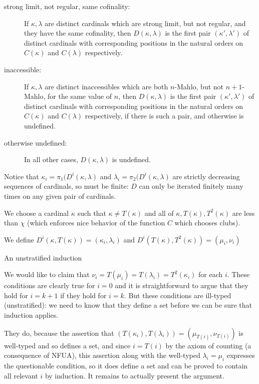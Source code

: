 \documentclass{slides}
\begin{document}
\begin{description}

\item[strong limit, not regular, same cofinality:]  If $\kappa,\lambda$ are distinct cardinals which are strong limit, but not regular, and they have the same cofinality, then
$D(\kappa,\lambda)$ is the first pair $(\kappa',\lambda')$ of distinct cardinals with corresponding positions in the natural orders on $C(\kappa)$ and $C(\lambda)$ respectively.

\item[inaccessible:]  If $\kappa,\lambda$ are distinct inaccessibles which are both $n$-Mahlo, but not $n+1$-Mahlo, for the same value of $n$, then $D(\kappa,\lambda)$ is the first pair $(\kappa',\lambda')$ of distinct cardinals with corresponding positions in the natural orders on $C(\kappa)$ and $C(\lambda)$ respectively, if there is such a pair, and otherwise is undefined.

\item[otherwise undefined:]  In all other cases, $D(\kappa,\lambda)$ is undefined.

\end{description}

\begin{slide}

Notice that $\kappa_i = \pi_1(D^i(\kappa,\lambda)$ and $\lambda_i = \pi_2(D^i(\kappa,\lambda)$ are strictly decreasing sequences of cardinals, so must be finite:  $D$ can only be iterated finitely many times on any given pair of cardinals.

We choose a cardinal $\kappa$ such that $\kappa \neq T(\kappa)$ and all of $\kappa, T(\kappa), T^2(\kappa)$ are less than $\chi$ (which enforces nice behavior of the function $C$ which chooses clubs).

We define $D^i(\kappa,T(\kappa)) = (\kappa_i,\lambda_i)$ and $D^i(T(\kappa),T^2(\kappa)) = (\mu_i,\nu_i)$


\end{slide}

\begin{slide}

{\Large An unstratified induction}

We would like to claim that $\nu_i = T(\mu_i) = T(\lambda_i) = T^2(\kappa_i)$ for each $i$.  These conditions are clearly true for $i=0$ and it is straightforward to argue
that they hold for $i=k+1$ if they hold for $i=k$.  But these conditions are ill-typed (unstratified):  we need to know that they define a set before we can be sure that induction applies.

They do, because the assertion that $(T(\kappa_i),T(\lambda_i)) = (\mu_{T(i)},\nu_{T(i)})$ is well-typed and so defines a set, and since $i=T(i)$ by the axiom of counting (a consequence of NFUA), this assertion along with the well-typed $\lambda_i=\mu_i$ expresses the questionable condition, so it does define a set and can be proved to contain all relevant $i$ by induction.  It remains to actually present the argument.

\end{slide}
\end{document}
